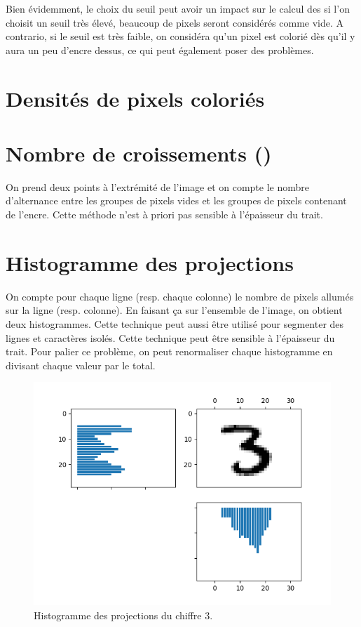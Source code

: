 Bien évidemment, le choix du seuil peut avoir un impact sur le calcul des 
\features si l'on choisit un seuil très élevé, beaucoup de pixels seront 
considérés comme vide. A contrario, si le seuil est très faible, on considéra 
qu'un pixel est colorié dès qu'il y aura un peu d'encre dessus, ce qui peut 
également poser des problèmes.



\section{Densités de pixels coloriés}



\section{Nombre de croissements ()}



On prend deux points à l’extrémité de l’image et on compte le nombre d’alternance 
entre les groupes de pixels vides et les groupes de pixels contenant de l’encre. 
Cette méthode n’est à priori pas sensible à l’épaisseur du trait.



\section{Histogramme des projections}



On compte pour chaque ligne (resp. chaque colonne) le nombre de pixels allumés sur 
la ligne (resp. colonne). 
En faisant ça sur l’ensemble de l’image, on obtient deux histogrammes. 
Cette technique peut aussi être utilisé pour segmenter des lignes et caractères isolés. 
Cette technique peut être sensible à l’épaisseur du trait. 
Pour palier ce problème, on peut renormaliser chaque histogramme en divisant 
chaque valeur par le total.

\begin{figure}[h]
  \centering
  \includegraphics[scale=0.5]{assets/features-hvhisto-ex1}
  \caption{Histogramme des projections du chiffre 3.}
  \label{fig:features-hvhisto-ex1}
\end{figure}



